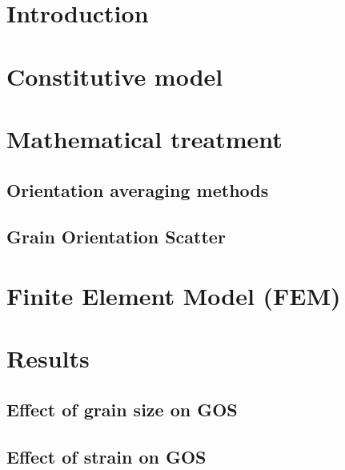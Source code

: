 \documentclass[10pt,a4paper,twocolumn]{article}
\author{
  Rodriguez, David Gonzalez\\
  \texttt{d.gonzalezrodriguez@bham.ac.uk}
  \and
  Wong, Hoi Yeung\\
  \texttt{OceanWongUK@gmail.com}
}
\begin{document}
\maketitle
\begin{abstract}
\end{abstract}

\section{Introduction}

\section{Constitutive model}

\section{Mathematical treatment}
	\subsection{Orientation averaging methods}
	\subsection{Grain Orientation Scatter}

\section{Finite Element Model (FEM)}

\section{Results}
	\subsection{Effect of grain size on GOS}

	\subsection{Effect of strain on GOS}
\end{document}

